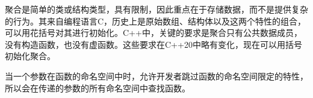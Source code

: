 


聚合是简单的类或结构类型，具有限制，因此重点在于存储数据，而不是提供复杂的行为。其来自编程语言C，历史上是原始数组、结构体以及这两个特性的组合，可以用花括号对其进行初始化。C++中，关键的要求是聚合只有公共数据成员，没有构造函数，也没有虚函数。这些要求在C++20中略有变化，现在可以用括号初始化聚合。


当一个参数在函数的命名空间中时，允许开发者跳过函数的命名空间限定的特性，所以会在传递的参数的所有命名空间中查找函数。





